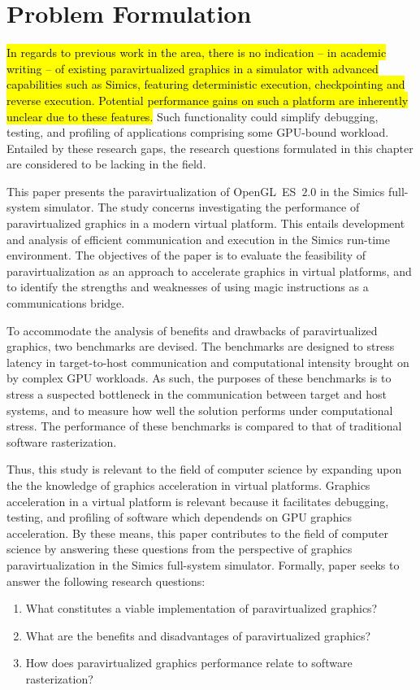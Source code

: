 
\section{Problem Formulation}
\label{sec:problemformulation}
\hl{In regards to previous work in the area, there is no indication -- in academic writing -- of existing paravirtualized graphics in a simulator with advanced capabilities such as Simics, featuring deterministic execution, checkpointing and reverse execution.
Potential performance gains on such a platform are inherently unclear due to these features.}
Such functionality could simplify debugging, testing, and profiling of applications comprising some GPU-bound workload.
Entailed by these research gaps, the research questions formulated in this chapter are considered to be lacking in the field.

This paper presents the paravirtualization of OpenGL~ES~$2.0$ in the Simics full-system simulator. 
The study concerns investigating the performance of paravirtualized graphics in a modern virtual platform.
This entails development and analysis of efficient communication and execution in the Simics run-time environment.
The objectives of the paper is to evaluate the feasibility of paravirtualization as an approach to accelerate graphics in virtual platforms, and to identify the strengths and weaknesses of using magic instructions as a communications bridge.

To accommodate the analysis of benefits and drawbacks of paravirtualized graphics, two benchmarks are devised.
The benchmarks are designed to stress latency in target-to-host communication and computational intensity brought on by complex GPU workloads.
As such, the purposes of these benchmarks is to stress a suspected bottleneck in the communication between target and host systems, and to measure how well the solution performs under computational stress.
The performance of these benchmarks is compared to that of traditional software rasterization.

Thus, this study is relevant to the field of computer science by expanding upon the the knowledge of graphics acceleration in virtual platforms.
Graphics acceleration in a virtual platform is relevant because it facilitates debugging, testing, and profiling of software which dependends on GPU graphics acceleration.
By these means, this paper contributes to the field of computer science by answering these questions from the perspective of graphics paravirtualization in the Simics full-system simulator.
Formally, paper seeks to answer the following research questions:

\begin{enumerate}
  \item What constitutes a viable implementation of paravirtualized graphics?
  \item What are the benefits and disadvantages of paravirtualized graphics?
  \item How does paravirtualized graphics performance relate to software rasterization?
\end{enumerate}
